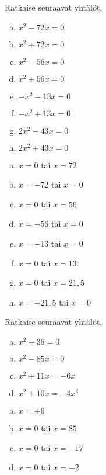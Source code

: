\begin{tehtava}
    Ratkaise seuraavat yhtälöt.
    \begin{enumerate}[a)]
        \item $x^2 - 72x = 0$
        \item $x^2 + 72x = 0$
        \item $x^2 - 56x = 0$
        \item $x^2 + 56x = 0$
        \item $-x^2 - 13x = 0$
        \item $-x^2 + 13x = 0$
        \item $2x^2 - 43x = 0$
        \item $2x^2 + 43x = 0$
    \end{enumerate}
    \begin{vastaus}
        \begin{enumerate}[a)]
            \item $x=0$ tai $x=72$
            \item $x=-72$ tai $x=0$
            \item $x=0$ tai $x=56$
            \item $x=-56$ tai $x=0$
            \item $x=-13$ tai $x=0$
            \item $x=0$ tai $x=13$
            \item $x=0$ tai $x=21,5$
            \item $x=-21,5$ tai $x=0$
        \end{enumerate}
    \end{vastaus}
\end{tehtava}

\begin{tehtava}
    Ratkaise seuraavat yhtälöt.
    \begin{enumerate}[a)]
        \item $x^2 - 36 = 0$
        \item $x^2 - 85x = 0$
        \item $x^2 + 11x = -6x$
        \item $x^2 + 10x = -4x^2$
    \end{enumerate}
    \begin{vastaus}
        \begin{enumerate}[a)]
            \item $x=\pm6$
            \item $x=0$ tai $x=85$
            \item $x=0$ tai $x=-17$
            \item $x=0$ tai $x=-2$
        \end{enumerate}
    \end{vastaus}
\end{tehtava}


